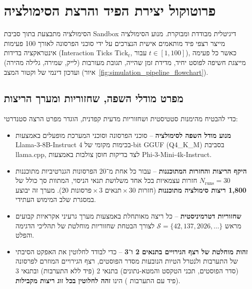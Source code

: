 \section{פרוטוקול יצירת הפיד והרצת הסימולציה}
\label{sec:meth_simulation_protocols}
הסימולציה מתבצעת בתוך סביבת \textenglish{Sandbox} דיגיטלית מבודדת ומבוקרת. מנוע הסימולציה מייצר רצפי פיד מותאמים אישית הנצרכים על ידי סוכני הפרסונה לאורך 100 פעימות אינטראקציה בדידות (\textenglish{Interaction Ticks} $\text{Tick}_t$, עבור $t \in [1, 100]$), כאשר כל פעימה מייצגת חשיפה לפוסט יחיד, מדידת זמן שהייה, תגובת מעורבות (לייק, שמירה, גלילה מהירה) ועדכון דינמי של וקטור המצב (איור~\ref{fig:simulation_pipeline_flowchart}).

\subsection{מפרט מודלי השפה, שחזוריות ומערך הריצות}
כדי להבטיח מהימנות סטטיסטית ושחזוריות מדעית קפדנית, הוגדר מפרט הרצה סטנדרטי:
\begin{itemize}
    \item \textbf{מנוע מודל השפה לסימולציה} -- סוכני הפרסונה וסוכני המערכת מופעלים באמצעות \textenglish{Llama-3-8B-Instruct} בכימות מקומי של \textenglish{4-bit GGUF (Q4\_K\_M)} בסביבת \textenglish{llama.cpp}, לצד בדיקות חוסן צולבות באמצעות \textenglish{Phi-3-Mini-4k-Instruct}.
    \item \textbf{היקף הריצות והחזרות המתוכננות} -- עבור כל אחת מ־20 הפרסונות הגנרטיביות מתוכננות $N_{\text{runs}} = 30$ חזרות עצמאיות בכל אחד משלושת תנאי הניסוי, המתוות סך כולל של \textbf{1,800 ריצות סימולציה מתוכננות} ($20 \text{ פרסונות} \times 3 \text{ תנאים} \times 30 \text{ חזרות}$). מערך זה יבוצע במסגרת שלב המימוש העתידי.
    \item \textbf{שחזוריות דטרמיניסטית} -- כל ריצה מאותחלת באמצעות מערך גרעיני אקראיות קבועים מראש $\mathcal{S} = \{42, 137, 2026, \dots\}$ לצורך הבטחת שחזוריות מוחלטת של תהליכי הדגימה והפלט.
    \item \textbf{זהות מוחלטת של רצף הגירויים בתנאים 2 ו־3} -- כדי לבודד לחלוטין את האפקט הסיבתי של התערבות \projectname{} ולנטרל הטיות הנובעות מסדר הפוסטים, רצף הגירויים המוזרם לפרסונה (סדר הפוסטים, תכני הטקסט והמטא-נתונים) בתנאי 2 (פיד ללא התערבות) ובתנאי 3 (פיד עם התערבות \projectname{}) הינו \textbf{זהה לחלוטין בכל זוג ריצות מקבילות}.
\end{itemize}


